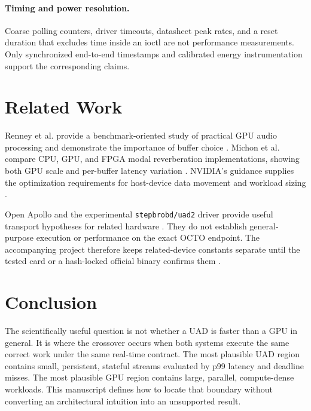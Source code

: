 \documentclass[10pt,twocolumn,twoside]{article}
\begin{document}
\paragraph{Timing and power resolution.}
Coarse polling counters, driver timeouts, datasheet peak rates, and a reset
duration that excludes time inside an ioctl are not performance measurements.
Only synchronized end-to-end timestamps and calibrated energy instrumentation
support the corresponding claims.

\section{Related Work}

Renney et al. provide a benchmark-oriented study of practical GPU audio
processing and demonstrate the importance of buffer choice \cite{renney2020}.
Michon et al. compare CPU, GPU, and FPGA modal reverberation implementations,
showing both GPU scale and per-buffer latency variation \cite{michon2025}.
NVIDIA's guidance supplies the optimization requirements for host-device data
movement and workload sizing \cite{nvidia-best-practices}.

Open Apollo and the experimental \texttt{stepbrobd/uad2} driver provide useful
transport hypotheses for related hardware \cite{open-apollo,stepbrobd-uad2}.
They do not establish general-purpose execution or performance on the exact
OCTO endpoint. The accompanying project therefore keeps related-device
constants separate until the tested card or a hash-locked official binary
confirms them \cite{uad-project}.

\section{Conclusion}

The scientifically useful question is not whether a UAD is faster than a GPU
in general. It is where the crossover occurs when both systems execute the same
correct work under the same real-time contract. The most plausible UAD region
contains small, persistent, stateful streams evaluated by p99 latency and
deadline misses. The most plausible GPU region contains large, parallel,
compute-dense workloads. This manuscript defines how to locate that boundary
without converting an architectural intuition into an unsupported result.
\end{document}
